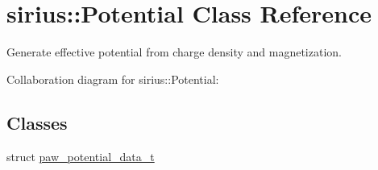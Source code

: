 \hypertarget{classsirius_1_1_potential}{}\section{sirius\+:\+:Potential Class Reference}
\label{classsirius_1_1_potential}


Generate effective potential from charge density and magnetization.  




Collaboration diagram for sirius\+:\+:Potential\+:
\subsection*{Classes}
\begin{DoxyCompactItemize}
\item 
struct \hyperlink{structsirius_1_1_potential_1_1paw__potential__data__t}{paw\+\_\+potential\+\_\+data\+\_\+t}
\end{DoxyCompactItemize}

